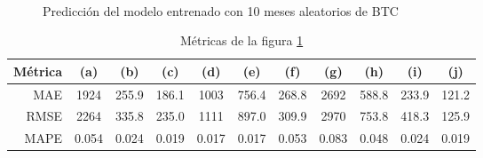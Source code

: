 \documentclass[a4paper,10pt]{article}
\begin{document}
\begin{figure}[H]
    \\
  \caption{Predicción del modelo entrenado con 10 meses aleatorios de BTC}
  \label{f:btc_mth_arima}
\end{figure}

\begin{table}[H]
 \begin{center}
 \resizebox{12cm}{!} {
  \begin{tabular}{|r|c|c|c|c|c|c|c|c|c|c|}
    Métrica & (a) & (b) & (c) & (d) & (e) & (f) & (g) & (h) & (i) & (j) \\ \hline
    MAE & 1924 & 255.9 & 186.1 & 1003 & 756.4 & 268.8 & 2692 & 588.8 & 233.9 & 121.2 \\
    RMSE & 2264 & 335.8 & 235.0 & 1111 & 897.0 & 309.9 & 2970 & 753.8 & 418.3 & 125.9 \\
    MAPE & 0.054 & 0.024 & 0.019 & 0.017 & 0.017 & 0.053 & 0.083 & 0.048 & 0.024 & 0.019 \\ \hline
  \end{tabular}
  }
  \caption{Métricas de la figura \ref{f:btc_mth_arima}}
  \label{tab:btc_wk}
 \end{center}
\end{table}
\end{document}
